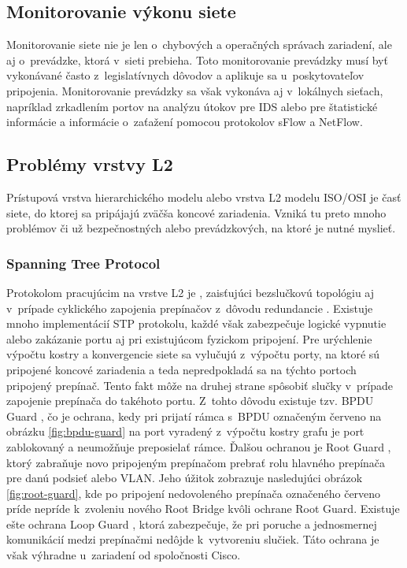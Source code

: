 \subsection{Monitorovanie výkonu siete}
Monitorovanie siete nie je len o~chybových a operačných správach zariadení, ale aj o~prevádzke, ktorá v~sieti prebieha. Toto monitorovanie prevádzky musí byť vykonávané často z~legislatívnych dôvodov a aplikuje sa u~poskytovateľov pripojenia. Monitorovanie prevádzky sa však vykonáva aj v~lokálnych sieťach, napríklad zrkadlením portov \cite{Singh2018} na analýzu útokov pre IDS alebo pre štatistické informácie a informácie o~zaťažení pomocou protokolov sFlow a NetFlow.

\subsection{Problémy vrstvy L2}
Prístupová vrstva hierarchického modelu alebo vrstva L2 modelu ISO/OSI je časť siete, do ktorej sa pripájajú zväčša koncové zariadenia. Vzniká tu preto mnoho problémov či už bezpečnostných alebo prevádzkových, na ktoré je nutné myslieť.

\subsubsection{Spanning Tree Protocol}
Protokolom pracujúcim na vrstve L2 je , zaisťujúci bezslučkovú topológiu aj v~prípade cyklického zapojenia prepínačov z~dôvodu redundancie \cite{Lammle2013}. Existuje mnoho implementácií STP protokolu, každé však zabezpečuje logické vypnutie alebo zakázanie portu aj pri existujúcom fyzickom pripojení. Pre urýchlenie výpočtu kostry a konvergencie siete sa vylučujú z~výpočtu porty, na ktoré sú pripojené koncové zariadenia a teda nepredpokladá sa na týchto portoch pripojený prepínač. Tento fakt môže na druhej strane spôsobiť slučky v~prípade zapojenie prepínača do takéhoto portu. Z~tohto dôvodu existuje tzv. BPDU Guard \cite{Lammle2013}, čo je ochrana, kedy pri prijatí rámca s~BPDU označeným červeno na obrázku  \ref{fig:bpdu-guard} na port vyradený z~výpočtu kostry grafu je port zablokovaný a neumožňuje preposielať rámce. Ďalšou ochranou je Root Guard \cite{Vyncke2008}, ktorý zabraňuje novo pripojeným prepínačom prebrať rolu hlavného prepínača pre danú podsieť alebo VLAN. Jeho úžitok zobrazuje nasledujúci obrázok \ref{fig:root-guard}, kde po pripojení nedovoleného prepínača označeného červeno príde nepríde k~zvoleniu nového Root Bridge kvôli ochrane Root Guard. Existuje ešte ochrana Loop Guard \cite{Vyncke2008}, ktorá zabezpečuje, že pri poruche a jednosmernej komunikácií medzi prepínačmi nedôjde k~vytvoreniu slučiek. Táto ochrana je však výhradne u~zariadení od spoločnosti Cisco. 


